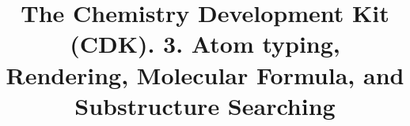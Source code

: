 \documentclass[10pt]{bmcart}
\begin{document}
\begin{frontmatter}

\begin{fmbox}

\title{The Chemistry Development Kit (CDK). 3. Atom typing, Rendering, Molecular Formula, and Substructure Searching}


\author[
   addressref={um},                                 %
   email={egon.willighagen@maastrichtuniversity.nl}
]{ }
\author[
   addressref={aff2},
   email={john@nextmovesoftware.com}
]{ }
\author[
   addressref={uppsala},
   email={jonathan.alvarsson@farmbio.uu.se}
]{ }
\author[
   addressref={uppsala},
   email={berg.arvid@gmail.com}
]{ }
\author[
   addressref={jena},
   email={kai.duehrkop@uni-jena.de}
]{ }
\author[
   addressref={idea},
   email={jeliazkova.nina@gmail.com}
]{ }
\author[
   addressref={leicester},
   email={shk12@le.ac.uk}
]{ }
\author[
   addressref={wi_mit},
   email={pluskal@wi.mit.edu}
]{~}
\author[
   addressref={miquel},                             %
   email={miguelrojasch@googlemail.com}
]{~}
\author[
   addressref={uppsala},
   email={ola.spjuth@farmbio.uu.se}
]{ }
\author[
   addressref={gilleain},                           %
   email={gilleain.torrance@gmail.com}
]{ }
\author[
   addressref={um},
   email={chris.evelo@maastrichtuniversity.nl}
]{ }
\author[
   addressref={nih},
   email={guhar@mail.nih.gov}
]{ }
\author[
   addressref={ebi},
   email={steinbeck@ebi.ac.uk}
]{~}


\end{fmbox}
\end{frontmatter}
\end{document}
